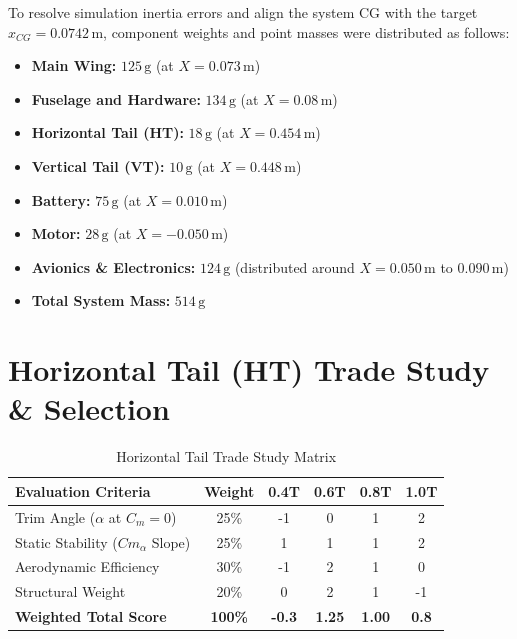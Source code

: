 \documentclass[11pt,a4paper]{article}
\begin{document}
To resolve simulation inertia errors and align the system CG with the target $x_{CG} = 0.0742\,\text{m}$, component weights and point masses were distributed as follows:
\begin{itemize}
    \item \textbf{Main Wing:} $125\,\text{g}$ (at $X = 0.073\,\text{m}$)
    \item \textbf{Fuselage and Hardware:} $134\,\text{g}$ (at $X = 0.08\,\text{m}$)
    \item \textbf{Horizontal Tail (HT):} $18\,\text{g}$ (at $X = 0.454\,\text{m}$)
    \item \textbf{Vertical Tail (VT):} $10\,\text{g}$ (at $X = 0.448\,\text{m}$)
    \item \textbf{Battery:} $75\,\text{g}$ (at $X = 0.010\,\text{m}$)
    \item \textbf{Motor:} $28\,\text{g}$ (at $X = -0.050\,\text{m}$)
    \item \textbf{Avionics \& Electronics:} $124\,\text{g}$ (distributed around $X = 0.050\,\text{m}$ to $0.090\,\text{m}$)
    \item \textbf{Total System Mass:} $514\,\text{g}$
\end{itemize}

\section{Horizontal Tail (HT) Trade Study \& Selection}


\begin{table}[H]
\centering
\caption{Horizontal Tail Trade Study Matrix}
\begin{tabular}{lccccc}
\toprule
\textbf{Evaluation Criteria} & \textbf{Weight} & \textbf{0.4T} & \textbf{0.6T} & \textbf{0.8T} & \textbf{1.0T} \\
\midrule
Trim Angle ($\alpha$ at $C_m=0$) & 25\% & -1 & 0 & 1 & 2 \\
Static Stability ($Cm_\alpha$ Slope) & 25\% & 1 & 1 & 1 & 2 \\
Aerodynamic Efficiency & 30\% & -1 & 2 & 1 & 0 \\
Structural Weight & 20\% & 0 & 2 & 1 & -1 \\
\midrule
\textbf{Weighted Total Score} & \textbf{100\%} & \textbf{-0.3} & \textbf{1.25} & \textbf{1.00} & \textbf{0.8} \\
\bottomrule
\end{tabular}
\end{table}
\end{document}
